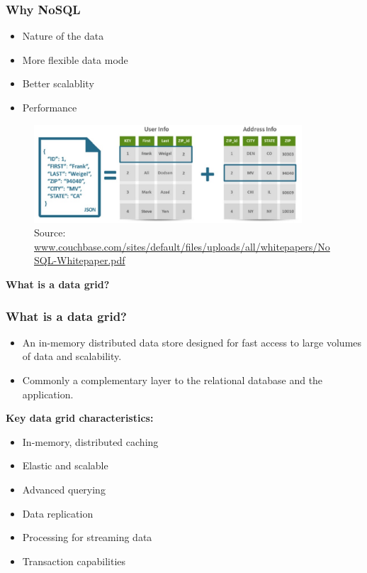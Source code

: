 \documentclass[10pt,utf8]{beamer}
\begin{document}
\begin{frame}
	\frametitle{Why NoSQL}
	\begin{itemize}
		\item Nature of the data
		\pause
		\item More flexible data mode
		\pause
		\item Better scalablity
		\pause
		\item Performance
	\end{itemize}
	\begin{figure}
		\centering
		\includegraphics[width=10cm]{./img/json_vs_sql.eps}
		\caption{\tiny{Source: \url{www.couchbase.com/sites/default/files/uploads/all/whitepapers/NoSQL-Whitepaper.pdf}}}
	\end{figure}
\end{frame}

\begin{frame}
	\centering
	\huge{\textbf{What is a data grid?}}
\end{frame}

\begin{frame}
	\frametitle{What is a data grid?}
	\begin{itemize}
	 \item An in-memory distributed data store designed for fast access to large volumes of data and scalability.
	 \item Commonly a complementary layer to the relational database and the application.
	\end{itemize}
	\centering
	 {
	\color{blue}\textbf{Key data grid characteristics:}\color{black}
	\begin{itemize}
	 \item In-memory, distributed caching
	 \item Elastic and scalable
	 \item Advanced querying
	 \item Data replication
	 \item Processing for streaming data
	 \item Transaction capabilities
	\end{itemize}
	}
\end{frame}
\end{document}

